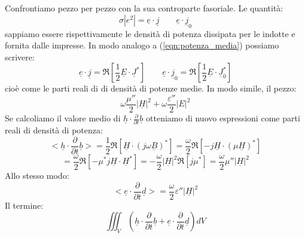 \documentclass{book}
\begin{document}
        Confrontiamo pezzo per pezzo con la sua controparte fasoriale. Le quantità:
        \begin{equation}
            \sigma |e^{2}| = \underline{e} \cdot \underline{j} \qquad \underline{e}\cdot \underline{j}_{0}
        \end{equation}
        sappiamo essere rispettivamente le densità di potenza dissipata per le indotte e fornita dalle impresse.
        In modo analogo a (\ref{eqn:potenza_media}) possiamo scrivere:
        \begin{equation}
             \underline{e} \cdot \underline{j} = \Re [\frac{1}{2}\underline{E}\cdot \underline{J}^{*}] 
             \qquad \underline{e}\cdot \underline{j}_{0} = \Re [\frac{1}{2}\underline{E}\cdot \underline{J}^{*}_{0}]
        \end{equation} 
        cioè come le parti reali di di densità di potenze medie. In modo simile, il pezzo:
        \begin{equation}
            \omega\frac{\mu ''}{2}|\underline{H}|^{2}+\omega \frac{\varepsilon ''}{2}|E|^{2}
        \end{equation}
        Se calcoliamo il valore medio di $\underline{h} \cdot \frac{\partial}{\partial t} \underline{b}$ otteniamo di nuovo espressioni
        come parti reali di densità di potenza:
        \begin{equation}
            <\underline{h} \cdot \frac{\partial}{\partial t} \underline{b}> = \frac{1}{2}\Re[\underline{H} \cdot (j \omega \underline{B})^{*}] =
            \frac{\omega}{2}\Re[-j \underline{H} \cdot (\mu \underline{H})^{*}] 
        \end{equation}
        \begin{equation}
            = \frac{\omega}{2}\Re[-\mu^{*}j \underline{H} \cdot \underline{H}^{*}] = - \frac{\omega}{2}|\underline{H}|^{2}\Re[j \mu^{*}]
            =\frac{\omega}{2}\mu '' |\underline{H}|^{2}
        \end{equation}
        Allo stesso modo:
        \begin{equation}
            <\underline{e} \cdot \frac{\partial}{ \partial t} \underline{d}> = \frac{\omega}{2}\varepsilon '' |\underline{H}|^{2}
        \end{equation}
        Il termine:
        \begin{equation}
            \iiint_{V} (\underline{h} \cdot \frac{\partial}{\partial t} \underline{b} + \underline{e} \cdot \frac{\partial}{\partial t} \underline{d}) dV
        \end{equation}
\end{document}
